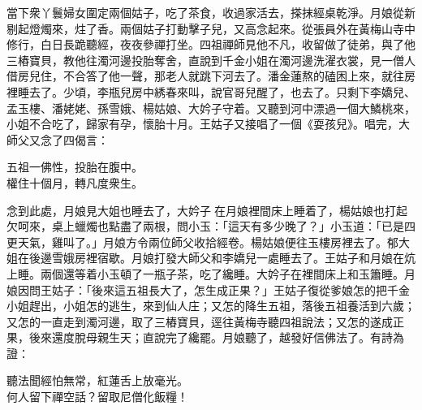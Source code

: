 當下衆丫鬟婦女圍定兩個姑子，吃了茶食，收過家活去，搽抹經桌乾淨。月娘從新剔起燈燭來，炷了香。兩個姑子打動擊子兒，又高念起來。從張員外在黃梅山寺中修行，白日長跪聽經，夜夜參禪打坐。四祖禪師見他不凡，收留做了徒弟，與了他三樁寶貝，教他往濁河邊投胎奪舍，直說到千金小姐在濁河邊洗濯衣裳，見一僧人借房兒住，不合答了他一聲，那老人就跳下河去了。潘金蓮熬的磕困上來，就往房裡睡去了。{}少頃，李瓶兒房中綉春來叫，說官哥兒醒了，也去了。只剩下李嬌兒、孟玉樓、潘姥姥、孫雪娥、楊姑娘、大妗子守着。又聽到河中漂過一個大鱗桃來，小姐不合吃了，歸家有孕，懷胎十月。王姑子又接唱了一個《耍孩兒》。唱完，大師父又念了四偈言：

\begin{myquote}
五祖一佛性，投胎在腹中。\\權住十個月，轉凡度衆生。
\end{myquote}

念到此處，月娘見大姐也睡去了，大妗子𢱉在月娘裡間床上睡着了，楊姑娘也打起欠呵來，{}桌上蠟燭也點盡了兩根，問小玉：「這天有多少晚了？」小玉道：「已是四更天氣，雞叫了。」月娘方令兩位師父收拾經卷。楊姑娘便往玉樓房裡去了。郁大姐在後邊雪娥房裡宿歇。月娘打發大師父和李嬌兒一處睡去了。王姑子和月娘在炕上睡。兩個還等着小玉頓了一瓶子茶，吃了纔睡。大妗子在裡間床上和玉簫睡。月娘因問王姑子：「後來這五祖長大了，怎生成正果？」{}王姑子復從爹娘怎的把千金小姐趕出，小姐怎的逃生，來到仙人庄；又怎的降生五祖，落後五祖養活到六歲；又怎的一直走到濁河邊，取了三樁寶貝，逕往黃梅寺聽四祖說法；又怎的遂成正果，後來還度脫母親生天；直說完了纔罷。月娘聽了，越發好信佛法了。有詩為證：

\begin{myquote}
聽法聞經怕無常，紅蓮舌上放毫光。\\何人留下禪空話？留取尼僧化飯糧！
\end{myquote}

 

